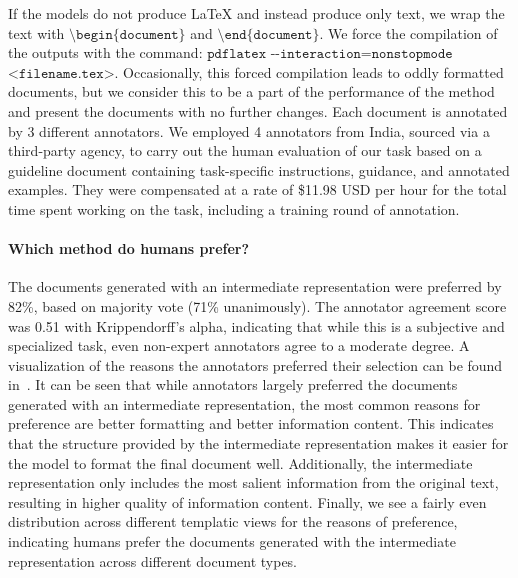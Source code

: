 If the models do not produce LaTeX and instead produce only text, we wrap the text with $\texttt{\textbackslash begin\{document\}}$ and $\texttt{\textbackslash end\{document\}}$. We force  the compilation of the outputs with the command: $\texttt{pdflatex -{}-interaction=nonstopmode}$ $\texttt{<filename.tex>}$. Occasionally, this forced compilation leads to oddly formatted documents, but we consider this to be a part of the performance of the method and present the documents with no further changes. Each document is annotated by 3 different annotators. We employed 4 annotators from India, sourced via a third-party agency, to carry out the human evaluation of our task based on a guideline document containing task-specific instructions, guidance, and annotated examples. They were compensated at a rate of \$11.98 USD per hour for the total time spent working on the task, including a training round of annotation.
% 

\vspace{-1mm}
\paragraph{Which method do humans prefer?} The documents generated with an intermediate representation were preferred by 82\%, based on majority vote (71\% unanimously). The annotator agreement score was 0.51 with Krippendorff's alpha, indicating that while this is a subjective and specialized task, even non-expert annotators agree to a moderate degree. 
A visualization of the reasons the annotators preferred their selection can be found in~. 
It can be seen that while annotators largely preferred the documents generated with an intermediate representation, the most common reasons for preference are better formatting and better information content. This indicates that the structure provided by the intermediate representation makes it easier for the model to format the final document well. Additionally, the intermediate representation only includes the most salient information from the original text, resulting in higher quality of information content. Finally, we see a fairly even distribution across different templatic views for the reasons of preference, indicating humans prefer the documents generated with the intermediate representation across different document types.

% 

